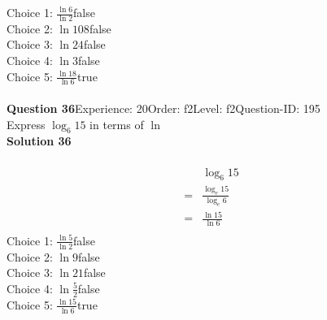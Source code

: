 \documentclass{article}
\begin{document}
Choice 1: \hspace{20pt}$\displaystyle\frac{\ln6}{\ln2}$\hspace{20pt}false\\
Choice 2: \hspace{20pt}$\ln{108}$\hspace{20pt}false\\
Choice 3: \hspace{20pt}$\ln{24}$\hspace{20pt}false\\
Choice 4: \hspace{20pt}$\ln{3}$\hspace{20pt}false\\
Choice 5: \hspace{20pt}$\displaystyle\frac{\ln18}{\ln6}$\hspace{20pt}true\\
\\[4pt]
\noindent\textbf{Question 36}\hspace{20pt}Experience: 20\hspace{20pt}Order: f2\hspace{20pt}Level: f2\hspace{20pt}Question-ID: 195\\[2pt]
Express $\log_{6}15$ in terms of $\ln$\\[4pt]
\noindent\textbf{Solution 36}\\[2pt]
\\[-35pt]\begin{align*}
&\log_{6}15\\[2pt]
=&\displaystyle\frac{\log_{e}15}{\log_{e}6}\\[2pt]
=&\displaystyle\frac{\ln15}{\ln6}\\[-100pt]
\end{align*}
Choice 1: \hspace{20pt}$\displaystyle\frac{\ln5}{\ln2}$\hspace{20pt}false\\
Choice 2: \hspace{20pt}$\ln{9}$\hspace{20pt}false\\
Choice 3: \hspace{20pt}$\ln{21}$\hspace{20pt}false\\
Choice 4: \hspace{20pt}$\ln{\displaystyle\frac{5}{2}}$\hspace{20pt}false\\
Choice 5: \hspace{20pt}$\displaystyle\frac{\ln15}{\ln6}$\hspace{20pt}true\\
\end{document}
